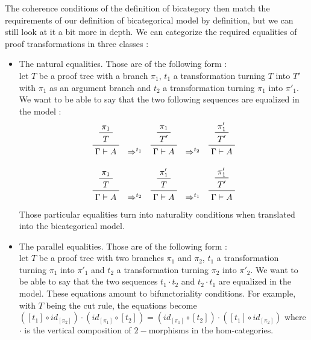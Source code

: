 \documentclass[a4paper, 12pt, twoside,openright]{report}
\begin{document}
The coherence conditions of the definition of bicategory then match the requirements of our definition of bicategorical model by definition, but we can still look at it a bit more in depth. We can categorize the required equalities of proof transformations in three classes : 
\begin{itemize}
\item The natural equalities. Those are of the following form  :\\

let $T$ be a proof tree with a branch $\pi_1$, $t_1$ a transformation turning $T$ into $T'$ with $\pi_1$ as an argument branch and $t_2$ a transformation turning $\pi_1$ into $\pi'_1$. We want to be able to say that the two following sequences are equalized in the model : 
$$
\begin{array}{ccccc}
\prftree{
	\prftree{\pi_1}{T}}
{\Gamma \vdash A}
&
\Rightarrow^{t_1}
&
\prftree{
	\prftree{\pi_1}{T'}}
{\Gamma \vdash A}
&
\Rightarrow^{t_2}
&
\prftree{
	\prftree{\pi'_1}{T'}}
{\Gamma \vdash A}
\\
\\
\prftree{
	\prftree{\pi_1}{T}}
{\Gamma \vdash A}
&
\Rightarrow^{t_2}
&
\prftree{
	\prftree{\pi'_1}{T}}
{\Gamma \vdash A}
&
\Rightarrow^{t_1}
&
\prftree{
	\prftree{\pi'_1}{T'}}
{\Gamma \vdash A}
\end{array}
$$
Those particular equalities turn into naturality conditions when translated into the bicategorical model.
\item The parallel equalities. Those are of the following form :\\

let $T$ be a proof tree with two branches $\pi_1$ and $\pi_2$, $t_1$ a transformation turning $\pi_1$ into $\pi'_1$ and $t_2$ a transformation turning $\pi_2$ into $\pi'_2$. We want to be able to say that the two sequences $t_1 \cdot t_2$ and $t_2 \cdot t_1$ are equalized in the model. These equations amount to bifunctoriality conditions. For example, with $T$ being the cut rule, the equations become $([t_1] \circ id_{[\pi_2]}) \cdot (id_{[\pi_1]} \circ [t_2] ) = (id_{[\pi_1]} \circ [t_2] ) \cdot ([t_1] \circ id_{[\pi_2]})$ where $\cdot$ is the vertical composition of $2-$morphisms in the hom-categories.


\end{itemize}
\end{document}
